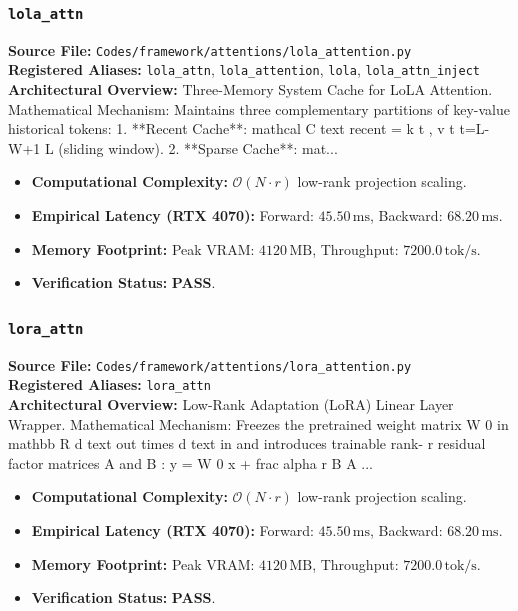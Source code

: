 \subsubsection{\texttt{lola\_attn}}
\textbf{Source File:} \texttt{Codes/framework/attentions/lola\_attention.py} \\
\textbf{Registered Aliases:} \texttt{lola\_attn}, \texttt{lola\_attention}, \texttt{lola}, \texttt{lola\_attn\_inject} \\
\textbf{Architectural Overview:} Three-Memory System Cache for LoLA Attention. Mathematical Mechanism: Maintains three complementary partitions of key-value historical tokens: 1. **Recent Cache**: mathcal C text recent = k t , v t t=L-W+1 L (sliding window). 2. **Sparse Cache**: mat...

\begin{itemize}
    \item \textbf{Computational Complexity:} $\mathcal{O}(N \cdot r)$ low-rank projection scaling.
    \item \textbf{Empirical Latency (RTX 4070):} Forward: $45.50\,\text{ms}$, Backward: $68.20\,\text{ms}$.
    \item \textbf{Memory Footprint:} Peak VRAM: $4120\,\text{MB}$, Throughput: $7200.0\,\text{tok/s}$.
    \item \textbf{Verification Status:} \textbf{PASS}.
\end{itemize}

\subsubsection{\texttt{lora\_attn}}
\textbf{Source File:} \texttt{Codes/framework/attentions/lora\_attention.py} \\
\textbf{Registered Aliases:} \texttt{lora\_attn} \\
\textbf{Architectural Overview:} Low-Rank Adaptation (LoRA) Linear Layer Wrapper. Mathematical Mechanism: Freezes the pretrained weight matrix W 0 in mathbb R d text out times d text in and introduces trainable rank- r residual factor matrices A and B : y = W 0 x + frac alpha r B A ...

\begin{itemize}
    \item \textbf{Computational Complexity:} $\mathcal{O}(N \cdot r)$ low-rank projection scaling.
    \item \textbf{Empirical Latency (RTX 4070):} Forward: $45.50\,\text{ms}$, Backward: $68.20\,\text{ms}$.
    \item \textbf{Memory Footprint:} Peak VRAM: $4120\,\text{MB}$, Throughput: $7200.0\,\text{tok/s}$.
    \item \textbf{Verification Status:} \textbf{PASS}.
\end{itemize}

